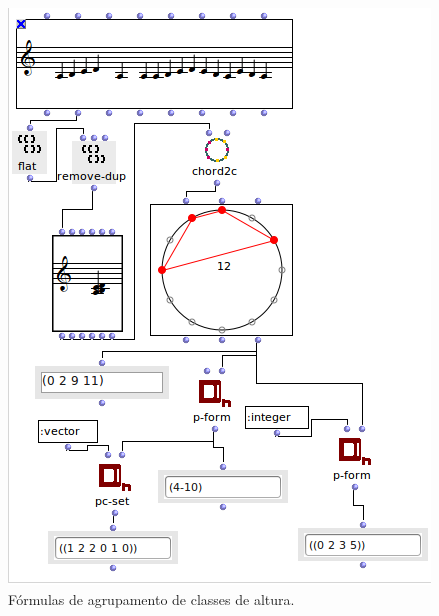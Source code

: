 \documentclass[
	12pt,				%
	openright,			%
	twoside,			%
	a4paper,			%
	english,			%
	french,				%
	spanish,			%
	brazil				%
	]{abntex2}
\begin{document}
\begin{figure}[h]
	\caption{\label{fig_grafico}Fórmulas de agrupamento de classes de altura. }
	\begin{center}
	    \includegraphics[scale=0.7]{OM_settheory/forma_prima_forte_vector.png}
	\end{center}
\end{figure}







\end{document}
